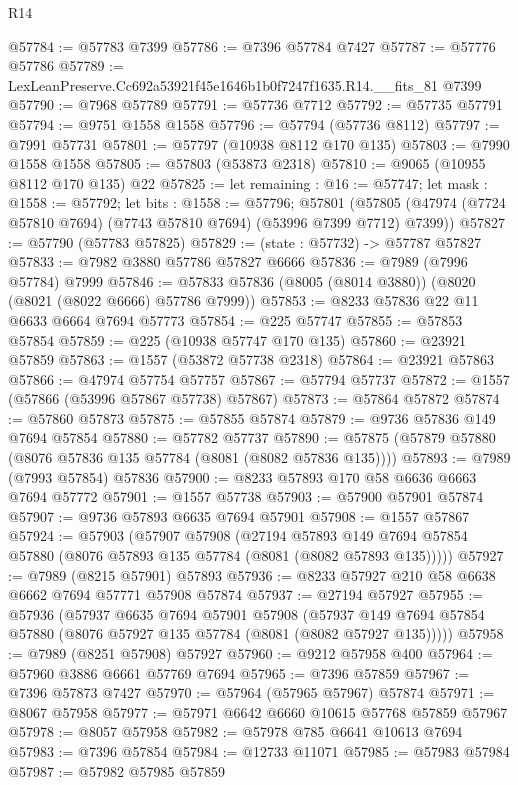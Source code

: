 \begin{lexlean}{R14}
\begin{coremodule}
@57784 := @57783 @7399
@57786 := @7396 @57784 @7427
@57787 := @57776 @57786
@57789 := LexLeanPreserve.Cc692a53921f45e1646b1b0f7247f1635.R14.__fits_81 @7399
@57790 := @7968 @57789
@57791 := @57736 @7712
@57792 := @57735 @57791
@57794 := @9751 @1558 @1558
@57796 := @57794 (@57736 @8112)
@57797 := @7991 @57731
@57801 := @57797 (@10938 @8112 @170 @135)
@57803 := @7990 @1558 @1558
@57805 := @57803 (@53873 @2318)
@57810 := @9065 (@10955 @8112 @170 @135) @22
@57825 := let remaining : @16 := @57747;
  let mask : @1558 := @57792;
  let bits : @1558 := @57796;
  @57801 (@57805 (@47974 (@7724 @57810 @7694) (@7743 @57810 @7694) (@53996 @7399 @7712) @7399))
@57827 := @57790 (@57783 @57825)
@57829 := (state : @57732) -> @57787 @57827
@57833 := @7982 @3880 @57786 @57827 @6666
@57836 := @7989 (@7996 @57784) @7999
@57846 := @57833 @57836 (@8005 (@8014 @3880)) (@8020 (@8021 (@8022 @6666) @57786 @7999))
@57853 := @8233 @57836 @22 @11 @6633 @6664 @7694 @57773
@57854 := @225 @57747
@57855 := @57853 @57854
@57859 := @225 (@10938 @57747 @170 @135)
@57860 := @23921 @57859
@57863 := @1557 (@53872 @57738 @2318)
@57864 := @23921 @57863
@57866 := @47974 @57754 @57757
@57867 := @57794 @57737
@57872 := @1557 (@57866 (@53996 @57867 @57738) @57867)
@57873 := @57864 @57872
@57874 := @57860 @57873
@57875 := @57855 @57874
@57879 := @9736 @57836 @149 @7694 @57854
@57880 := @57782 @57737
@57890 := @57875 (@57879 @57880 (@8076 @57836 @135 @57784 (@8081 (@8082 @57836 @135))))
@57893 := @7989 (@7993 @57854) @57836
@57900 := @8233 @57893 @170 @58 @6636 @6663 @7694 @57772
@57901 := @1557 @57738
@57903 := @57900 @57901 @57874
@57907 := @9736 @57893 @6635 @7694 @57901
@57908 := @1557 @57867
@57924 := @57903
    (@57907
      @57908
      (@27194
        @57893
        @149
        @7694
        @57854
        @57880
        (@8076 @57893 @135 @57784 (@8081 (@8082 @57893 @135)))))
@57927 := @7989 (@8215 @57901) @57893
@57936 := @8233 @57927 @210 @58 @6638 @6662 @7694 @57771 @57908 @57874
@57937 := @27194 @57927
@57955 := @57936
    (@57937
      @6635
      @7694
      @57901
      @57908
      (@57937 @149 @7694 @57854 @57880 (@8076 @57927 @135 @57784 (@8081 (@8082 @57927 @135)))))
@57958 := @7989 (@8251 @57908) @57927
@57960 := @9212 @57958 @400
@57964 := @57960 @3886 @6661 @57769 @7694
@57965 := @7396 @57859
@57967 := @7396 @57873 @7427
@57970 := @57964 (@57965 @57967) @57874
@57971 := @8067 @57958
@57977 := @57971 @6642 @6660 @10615 @57768 @57859 @57967
@57978 := @8057 @57958
@57982 := @57978 @785 @6641 @10613 @7694
@57983 := @7396 @57854
@57984 := @12733 @11071
@57985 := @57983 @57984
@57987 := @57982 @57985 @57859

\end{coremodule}
\end{lexlean}
